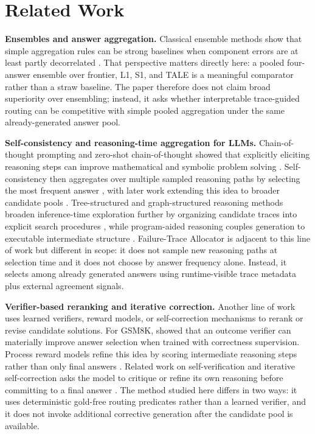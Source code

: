 \section{Related Work}
\label{sec:related_work}

\medskip\noindent\textbf{Ensembles and answer aggregation.}
Classical ensemble methods show that simple aggregation rules can be strong baselines when component errors are at least partly decorrelated \citep{breiman1996bagging,freund1997decisiontheoretic,kittler1998combining,dietterich2000ensemble,zhou2012ensemble}.
That perspective matters directly here: a pooled four-answer ensemble over frontier, L1, S1, and TALE is a meaningful comparator rather than a straw baseline.
The paper therefore does not claim broad superiority over ensembling; instead, it asks whether interpretable trace-guided routing can be competitive with simple pooled aggregation under the same already-generated answer pool.

\medskip\noindent\textbf{Self-consistency and reasoning-time aggregation for LLMs.}
Chain-of-thought prompting and zero-shot chain-of-thought showed that explicitly eliciting reasoning steps can improve mathematical and symbolic problem solving \citep{wei2022chain,kojima2022large}.
Self-consistency then aggregates over multiple sampled reasoning paths by selecting the most frequent answer \citep{wang2023self}, with later work extending this idea to broader candidate pools \citep{chen2023universalselfconsistency}.
Tree-structured and graph-structured reasoning methods broaden inference-time exploration further by organizing candidate traces into explicit search procedures \citep{yao2023tree,besta2024graph}, while program-aided reasoning couples generation to executable intermediate structure \citep{gao2023pal}.
Failure-Trace Allocator is adjacent to this line of work but different in scope: it does not sample new reasoning paths at selection time and it does not choose by answer frequency alone.
Instead, it selects among already generated answers using runtime-visible trace metadata plus external agreement signals.

\medskip\noindent\textbf{Verifier-based reranking and iterative correction.}
Another line of work uses learned verifiers, reward models, or self-correction mechanisms to rerank or revise candidate solutions.
For GSM8K, \citet{cobbe2021training} showed that an outcome verifier can materially improve answer selection when trained with correctness supervision.
Process reward models refine this idea by scoring intermediate reasoning steps rather than only final answers \citep{lightman2024lets}.
Related work on self-verification and iterative self-correction asks the model to critique or refine its own reasoning before committing to a final answer \citep{weng2023largelanguagemodelsbetter,madaan2023selfrefineiterativerefinementselffeedback}.
The method studied here differs in two ways: it uses deterministic gold-free routing predicates rather than a learned verifier, and it does not invoke additional corrective generation after the candidate pool is available.

